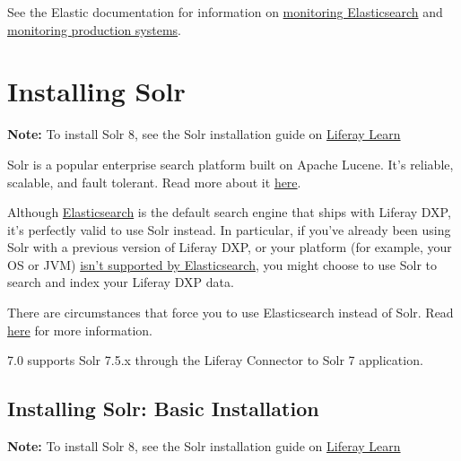 See the Elastic documentation for information on
\href{https://www.elastic.co/guide/en/elasticsearch/reference/6.1/es-monitoring.html}{monitoring
Elasticsearch} and
\href{https://www.elastic.co/guide/en/x-pack/6.1/monitoring-production.html}{monitoring
production systems}.

\chapter{Installing Solr}\label{installing-solr}

\noindent\hrulefill

\textbf{Note:} To install Solr 8, see the Solr installation guide on
\href{https://learn.liferay.com/dxp/latest/en/using-search/installing-and-upgrading-a-search-engine/solr/installing-solr.html}{Liferay
Learn}

\noindent\hrulefill

Solr is a popular enterprise search platform built on Apache Lucene.
It's reliable, scalable, and fault tolerant. Read more about it
\href{http://lucene.apache.org/solr/}{here}.

Although
\href{/docs/7-1/deploy/-/knowledge_base/d/configuring-elasticsearch-for-liferay-0}{Elasticsearch}
is the default search engine that ships with Liferay DXP, it's perfectly
valid to use Solr instead. In particular, if you've already been using
Solr with a previous version of Liferay DXP, or your platform (for
example, your OS or JVM)
\href{https://www.elastic.co/support/matrix}{isn't supported by
Elasticsearch}, you might choose to use Solr to search and index your
Liferay DXP data.

There are circumstances that force you to use Elasticsearch instead of
Solr. Read
\href{/docs/7-1/deploy/-/knowledge_base/d/installing-a-search-engine\#choosing-a-search-engine}{here}
for more information.

7.0 supports Solr 7.5.x through the Liferay Connector to Solr 7
application.

\section{Installing Solr: Basic
Installation}\label{installing-solr-basic-installation}

\noindent\hrulefill

\textbf{Note:} To install Solr 8, see the Solr installation guide on
\href{https://learn.liferay.com/dxp/latest/en/using-search/installing-and-upgrading-a-search-engine/solr/installing-solr.html}{Liferay
Learn}

